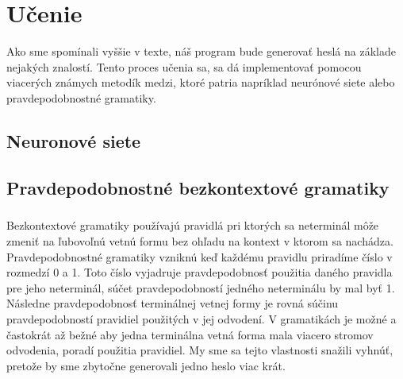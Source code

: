 \chapter{Učenie}
Ako sme spomínali vyššie v texte, náš program bude generovať heslá na základe nejakých znalostí. Tento proces učenia sa, sa dá implementovať pomocou viacerých známych metodík medzi, ktoré patria napríklad neurónové siete alebo pravdepodobnostné gramatiky.

\section{Neuronové siete}
\paragraph{}


\section{Pravdepodobnostné bezkontextové gramatiky}
\paragraph{}
Bezkontextové gramatiky používajú pravidlá pri ktorých sa neterminál môže zmeniť na ľubovoľnú vetnú formu bez ohľadu na kontext v ktorom sa nachádza. Pravdepodobnostné gramatiky vzniknú keď každému pravidlu priradíme číslo v rozmedzí 0 a 1. Toto číslo vyjadruje pravdepodobnosť použitia daného pravidla pre jeho neterminál, súčet pravdepodobností jedného neterminálu by mal byť 1. Následne pravdepodobnosť terminálnej vetnej formy je rovná súčinu pravdepodobností pravidiel použitých v jej odvodení. V gramatikách je možné a častokrát až bežné aby jedna terminálna vetná forma mala viacero stromov odvodenia, poradí použitia pravidiel. My sme sa tejto vlastnosti snažili vyhnúť, pretože by sme zbytočne generovali jedno heslo viac krát.

